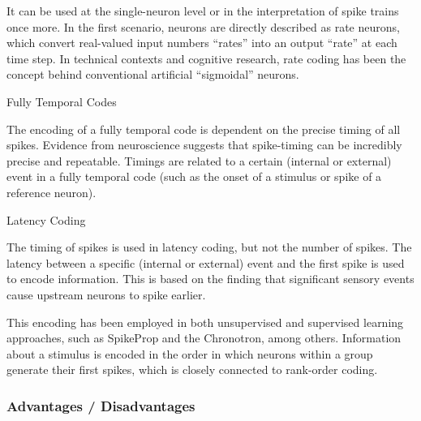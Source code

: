 \documentclass{article}
\begin{document}
{  It can be used at the single-neuron level or in the interpretation of spike trains once more. In the first scenario, neurons are directly described as rate neurons, which convert real-valued input numbers  “rates”  into an output “rate” at each time step. In technical contexts and cognitive research, rate coding has been the concept behind conventional artificial “sigmoidal” neurons.

  Fully Temporal Codes

  The encoding of a fully temporal code is dependent on the precise timing of all spikes. Evidence from neuroscience suggests that spike-timing can be incredibly precise and repeatable. Timings are related to a certain (internal or external) event in a fully temporal code (such as the onset of a stimulus or spike of a reference neuron).

  Latency Coding

  The timing of spikes is used in latency coding, but not the number of spikes. The latency between a specific (internal or external) event and the first spike is used to encode information. This is based on the finding that significant sensory events cause upstream neurons to spike earlier.

  This encoding has been employed in both unsupervised and supervised learning approaches, such as SpikeProp and the Chronotron, among others. Information about a stimulus is encoded in the order in which neurons within a group generate their first spikes, which is closely connected to rank-order coding.
}


\subsubsection{Advantages / Disadvantages}
\end{document}
